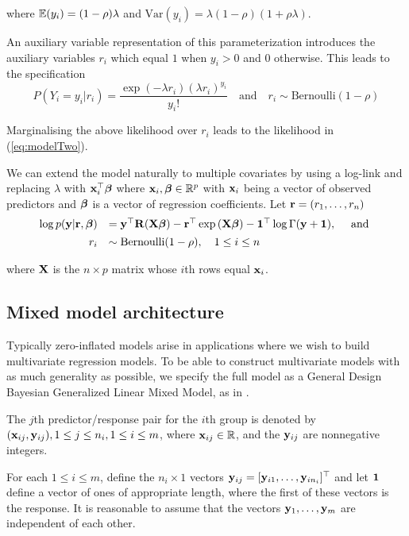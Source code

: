 \documentclass{amsart}[12pt]
\begin{document}
\noindent where ${\mathbb E}(y_i) = (1 - \rho)\lambda$ 
and $\mbox{Var}(y_i) =  \lambda(1 - \rho)(1 + \rho\lambda)$.

An auxiliary variable representation of this parameterization introduces the auxiliary variables $r_i$ which
equal $1$ when $y_i>0$ and $0$ otherwise. This leads to the specification
$$
P(Y_i=y_i|r_i) = \frac{\exp(-\lambda r_i)(\lambda r_i)^{y_i}}{y_i!} \quad \mbox{and} \quad r_i \sim \mbox{Bernoulli}(1-\rho)
$$

\noindent Marginalising the above likelihood over $r_i$ leads to the likelihood in (\ref{eq:modelTwo}).

We can extend the model naturally to multiple covariates by using a log-link and replacing $\lambda$ with
${\bf x}_i^\top {\boldsymbol\beta}$ where ${\bf x}_i,{\boldsymbol \beta}\in{\mathbb R}^p$ with ${\bf x}_i$ being a vector of observed predictors and
${\boldsymbol \beta}$ is  a vector of regression coefficients. Let ${\bf r} = (r_1,\ldots,r_n)$ 
\begin{equation}%
	\begin{array}{rl}
		\log p(\vy|\vr, \vbeta) 
		    & = \vy^\top \mR (\mX\vbeta)                           
		- \vr^\top \exp{(\mX\vbeta)} 
		- \vone^\top \log{\Gamma{(\vy + \vone)}}, \quad \mbox{ and }\\ [1ex]
		r_i & \sim \text{Bernoulli}(1-\rho), \quad 1 \leq i \leq n \\
	\end{array}
\end{equation} 

\noindent where ${\bf X}$ is the $n\times p$ matrix whose $i$th rows equal ${\bf x}_i$.

\subsection{Mixed model architecture}

Typically zero-inflated models arise in applications where we wish to build multivariate regression models. To
be able to construct multivariate models with as much generality as possible, we specify the full model as a
General Design Bayesian Generalized Linear Mixed Model, as in \citep{zhao06}.

The $j$th predictor/response pair for the $i$th group is denoted by $({\bf x}_{ij}, {\bf y}_{ij}), 1 \leq j \leq n_i, 1 \leq i \leq m$, where ${\bf x}_{ij} \in {\mathbb{R}}$, and the ${\bf y}_{ij}$ are nonnegative integers.

For each $1 \leq i \leq m$, define the $n_i \times 1$ vectors ${\bf y}_{ij} = [{\bf y}_{i 1}, \ldots, {\bf y}_{i
	n_i}]^\top$ and let ${\bf 1}$ define a vector of ones of appropriate length, where the first of these vectors is
the response. It is reasonable to assume that the vectors ${\bf y}_1, \ldots, {\bf y}_m$ are independent of each
other.
\end{document}
